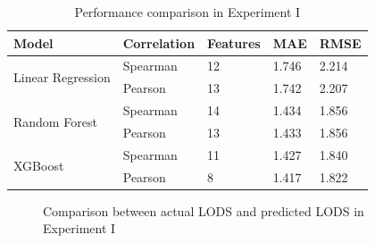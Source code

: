 \documentclass[12pt,a4paper,english
]{tunithesis}
\begin{document}
\begin{table}[]
\centering
    \caption{Performance comparison in Experiment I}
    \label{table:Perfomance_comparison}
    \begin{tabular}{|l|l|l|l|l|}
        \hline
        \textbf{Model} & \textbf{Correlation} & \textbf{Features} & \textbf{MAE} & \textbf{RMSE} \\ \hline
        \multirow{2}{*}{Linear Regression} & Spearman & 12 & 1.746 & 2.214 \\ \cline{2-5} 
         & Pearson & 13 & 1.742 & 2.207 \\ \hline
        \multirow{2}{*}{Random Forest} & Spearman & 14 & 1.434 & 1.856 \\ \cline{2-5} 
         & Pearson & 13 & 1.433 & 1.856 \\ \hline
        \multirow{2}{*}{XGBoost} & Spearman & 11& 1.427& 1.840\\ \cline{2-5} 
         & Pearson & 8 & 1.417 & 1.822 \\ \hline
    \end{tabular}
\end{table}

\begin{figure}
  \begin{center}
    \qquad                        
    \caption[Actual value \& Predicted value]{Comparison between actual LODS and predicted LODS in Experiment I}
    \label{fig:experiment_1_result}
  \end{center}
\end{figure}
\end{document}
